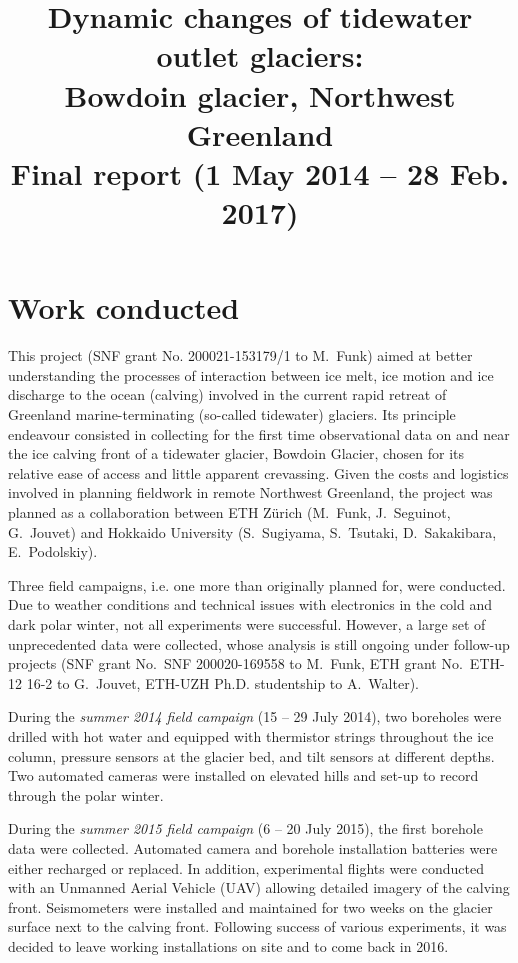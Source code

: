 \documentclass{article}
\title{Dynamic changes of tidewater outlet glaciers:\\
       Bowdoin glacier, Northwest Greenland\\\bigskip
       \large Final report (1 May 2014 -- 28 Feb. 2017)}
\author{}
\date{}
\begin{document}

\maketitle

\section{Work conducted}

This project (SNF grant No. 200021-153179/1 to M.~Funk) aimed at better
understanding the processes of interaction between ice melt, ice motion and ice
discharge to the ocean (calving) involved in the current rapid retreat of
Greenland marine-terminating (so-called tidewater) glaciers. Its principle
endeavour consisted in collecting for the first time observational data on and
near the ice calving front of a tidewater glacier, Bowdoin Glacier, chosen for
its relative ease of access and little apparent crevassing. Given the costs and
logistics involved in planning fieldwork in remote Northwest Greenland, the
project was planned as a collaboration between ETH Zürich (M.~Funk,
J.~Seguinot, G.~Jouvet) and Hokkaido University (S.~Sugiyama, S.~Tsutaki,
D.~Sakakibara, E.~Podolskiy).

Three field campaigns, i.e. one more than originally planned for, were
conducted. Due to weather conditions and technical issues with electronics in
the cold and dark polar winter, not all experiments were successful. However, a
large set of unprecedented data were collected, whose analysis is still ongoing
under follow-up projects (SNF grant No.~SNF 200020-169558 to M.~Funk, ETH grant
No.~ETH-12 16-2 to G.~Jouvet, ETH-UZH Ph.D. studentship to A.~Walter).

During the \emph{summer 2014 field campaign} (15 -- 29 July 2014), two
boreholes were drilled with hot water and equipped with thermistor strings
throughout the ice column, pressure sensors at the glacier bed, and
tilt sensors at different depths. Two automated cameras were installed on
elevated hills and set-up to record through the polar winter.

During the \emph{summer 2015 field campaign} (6 -- 20 July 2015), the first
borehole data were collected. Automated camera and borehole installation
batteries were either recharged or replaced. In addition, experimental flights
were conducted with an Unmanned Aerial Vehicle (UAV) allowing detailed imagery
of the calving front. Seismometers were installed and maintained for two weeks
on the glacier surface next to the calving front. Following success of various
experiments, it was decided to leave working installations on site and to come
back in 2016.
\end{document}
